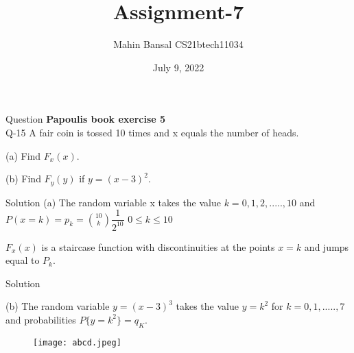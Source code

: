 \documentclass[15pt]{beamer}
\title{Assignment-7}
\author{Mahin Bansal  CS21btech11034}
\date{July 9, 2022}
\begin{document}
    \maketitle
    
    \begin{frame}{Question}
        \textbf{Papoulis book exercise 5}\\
        \large \noindent Q-15 A fair coin is tossed 10 times and x equals the number of heads.
        
        (a) Find $F_x(x)$.
        
        (b) Find $F_y(y)$ if $y = (x-3)^2$.
    \end{frame}
    \begin{frame}{Solution}
    (a) The random variable x takes the value $k = 0,1,2,.....,10$ and \\
     \hspace{5mm}$P(x=k) = p_k = {10\choose k}\dfrac{1}{2^{10}}$ \hspace{5mm} $0\leq k \leq 10$
    
    $F_x(x)$ is a staircase function with discontinuities at the points $x=k$ and jumps equal to $P_k$.
    \end{frame}
    \begin{frame}{Solution}
    
    (b) The random variable $y = (x - 3)^3$
    takes the value $y = k^2$ for $k = 0,1,.....,7$ and probabilities $P\{y = k^2\} = q_K$.

       \begin{figure}[!ht]
		\centering
		\texttt{[image: abcd.jpeg]}
	
		\label{fig1}
	\end{figure}
    \end{frame}   
\end{document}
